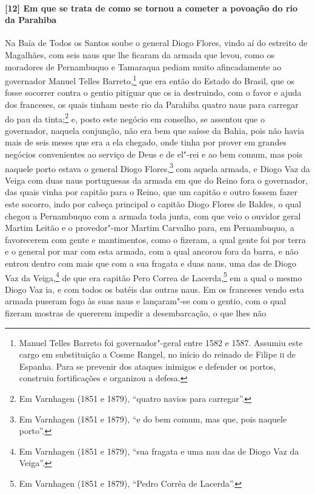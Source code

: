 \paragraph{[12] Em que se trata de como se tornou a cometer a povoação do rio da Parahiba} \quad
Na Baía de Todos os Santos soube o general Diogo Flores, vindo aí do estreito de
Magalhães, com seis naus que lhe ficaram da armada que levou, como os moradores de
Pernambuquo e Tamaraqua pediam muito afincadamente ao governador Manuel Telles
Barreto,\footnote{ Manuel Telles Barreto foi governador"-geral entre 1582 e 1587. Assumiu
este cargo em substituição a Cosme Rangel, no início do reinado de Filipe \textsc{ii} de
Espanha. Para se prevenir dos ataques inimigos e defender os portos, construiu
fortificações e organizou a defesa.} que era então do Estado do Brasil, que os fosse
socorrer contra o gentio pitiguar que os ia destruindo, com o favor e ajuda dos franceses,
os quais tinham neste rio da Parahiba quatro naus para carregar do pau da tinta;\footnote{
Em Varnhagen (1851 e 1879), ``quatro navios para carregar''.} e, posto este negócio em
conselho, se assentou que o governador, naquela conjunção, não era bem que saísse da
Bahia, pois não havia mais de seis meses que era a ela chegado, onde tinha por prover em
grandes negócios convenientes ao serviço de Deus e de el"-rei e ao bem comum, mas pois
naquele porto estava o general Diogo Flores,\footnote{ Em Varnhagen (1851 e 1879), ``e do
bem comum, mas que, pois naquele porto''.} com aquela armada, e Diogo Vaz da Veiga com
duas naus portuguesas da armada em que do Reino fora o governador, das quais vinha por
capitão para o Reino, que um capitão e outro fossem fazer este socorro, indo por cabeça
principal o capitão Diogo Flores de Baldes, o qual chegou a Pernambuquo com a armada toda
junta, com que veio o ouvidor geral Martim Leitão e o provedor"-mor Martim Carvalho para,
em Pernambuquo, a favorecerem com gente e mantimentos, como o fizeram, a qual gente foi
por terra e o general por mar com esta armada, com a qual ancorou fora da barra, e não
entrou dentro com mais que com a sua fragata e duas naus, uma das de Diogo Vaz da
Veiga,\footnote{ Em Varnhagen (1851 e 1879), ``sua fragata e uma nau das de Diogo Vaz da
Veiga''.} de que era capitão Pero Correa de Lacerda,\footnote{ Em Varnhagen (1851 e 1879),
``Pedro Corrêa de Lacerda''.} em a qual o mesmo Diogo Vaz ia, e com todos os batéis das
outras naus. Em os franceses vendo esta armada puseram fogo às suas naus e lançaram"-se com
o gentio, com o qual fizeram mostras de quererem impedir a desembarcação, o que lhes não
